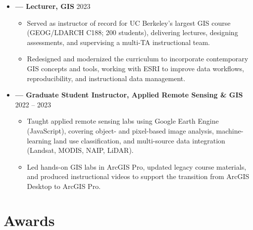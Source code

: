 \documentclass[a4paper,12pt]{article}
\makeatletter
\newenvironment{joblong}[2]
{
\begin{tabularx}{\linewidth}{@{}l X r@{}}
\textbf{#1} & \hfill &  #2 \\[3.75pt]
\end{tabularx}
\begin{minipage}[t]{\linewidth}
\begin{itemize}[nosep,after=\strut,leftmargin=1.2em,itemsep=3pt,label=--]
}
{
\end{itemize}
\end{minipage}
}
\makeatother
\begin{document}
\begin{itemize}[leftmargin=1.5em, label={}]
    \item \textbf{— Lecturer, GIS} \hfill 2023
    \begin{itemize}[nosep, leftmargin=1.2em, label=--]
        \item Served as instructor of record for UC Berkeley’s largest GIS course (GEOG/LDARCH C188; 200 students), delivering lectures, designing assessments, and supervising a multi-TA instructional team.
        \item Redesigned and modernized the curriculum to incorporate contemporary GIS concepts and tools, working with ESRI to improve data workflows, reproducibility, and instructional data management.
    \end{itemize}
    
    \vspace{3pt}

    \item \textbf{— Graduate Student Instructor, Applied Remote Sensing \& GIS} \hfill 2022 -- 2023
    \begin{itemize}[nosep, leftmargin=1.2em, label=--]
        \item Taught applied remote sensing labs using Google Earth Engine (JavaScript), covering object- and pixel-based image analysis, machine-learning land use classification, and multi-source data integration (Landsat, MODIS, NAIP, LiDAR).
        \item Led hands-on GIS labs in ArcGIS Pro, updated legacy course materials, and produced instructional videos to support the transition from ArcGIS Desktop to ArcGIS Pro.
    \end{itemize}
\end{itemize}

\section{Awards}
\end{document}
